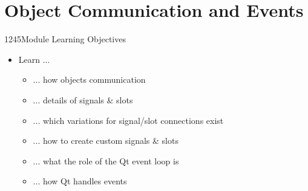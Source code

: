 %
%
%
%

\section{Object Communication and Events}

\begin{slide}{1245}{Module Learning Objectives}
\begin{itemize}
\item Learn ...
  \begin{itemize}
  \item ... how objects communication
  \item ... details of signals \& slots
  \item ... which variations for signal/slot connections exist
  \item ... how to create custom signals \& slots
  \item ... what the role of the Qt event loop is
  \item ... how Qt handles events
  \end{itemize}
\end{itemize}

\end{slide}





